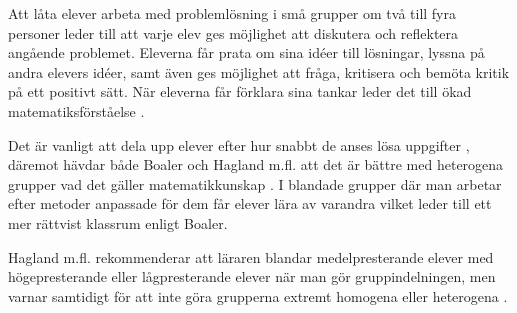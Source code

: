 \textcolor{turkos} {
    Att låta elever arbeta med problemlösning i små grupper om två till fyra personer leder till att varje elev ges möjlighet att diskutera och reflektera angående problemet. Eleverna får prata om sina idéer till lösningar, lyssna på andra elevers idéer, samt även ges möjlighet att fråga, kritisera och bemöta kritik på ett positivt sätt. När eleverna får förklara sina tankar leder det till ökad matematiksförståelse \cite{RikaProblem}.
}




\textcolor{turkos} { Det är vanligt att dela upp elever efter hur snabbt de anses lösa uppgifter \cite{Skolverket03}, däremot hävdar både Boaler och Hagland m.fl. att det är bättre med heterogena grupper vad det gäller matematikkunskap \cite{TheElephant} \cite{RikaProblem}. I blandade grupper där man arbetar efter metoder anpassade för dem får elever lära av varandra vilket leder till ett mer rättvist klassrum enligt Boaler. }


\textcolor{turkos} {
Hagland m.fl. rekommenderar att läraren blandar medelpresterande elever med högepresterande eller lågpresterande elever när man gör gruppindelningen, men varnar samtidigt för att inte göra grupperna extremt homogena eller heterogena \cite{RikaProblem}.
}


